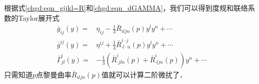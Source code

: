 根据式\eqref{chgd:eqn_gijkl=R}和\eqref{chgd:eqn_dGAMMA}，我们可以得到度规和联络系数的Taylor展开式
\begin{align}
    \bar{g}_{ij}(y) = & \eta_{ij} - \frac{1}{3}\bar{R}_{iljn}(p) y^l y^n + \cdots \label{chgd:eqn_g-normal} \\
    \bar{g}^{ij}(y) = & \eta^{ij} + \frac{1}{3}\bar{R}_{\cdot l\cdot n}^{i\cdot j}(p) y^l y^n
      + \cdots \label{chgd:eqn_g1-normal} \\
    \bar{\Gamma}_{jl}^{i}(y)=& -\frac{1}{3}\left(
      \bar{R}_{\cdot jln}^i(p)+\bar{R}_{\cdot ljn}^i(p) \right) y^n +\cdots \label{chgd:eqn_Gamma-normal}
\end{align}
只需知道$p$点黎曼曲率$\bar{R}_{iljn}(p)$值就可以计算二阶微扰了．


%
%
%
%





